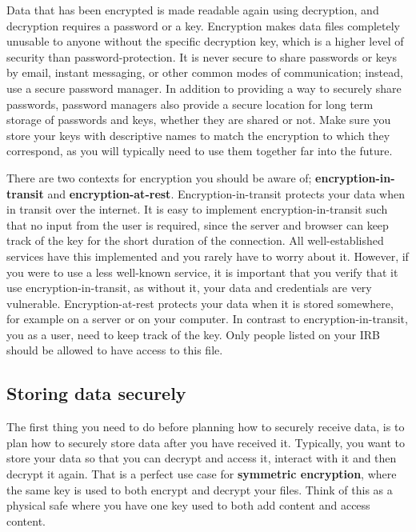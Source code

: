 Data that has been encrypted is made readable again using decryption,
and decryption requires a password or a key.
Encryption makes data files completely unusable
to anyone without the specific decryption key,
which is a higher level of security than password-protection.
It is never secure to share passwords or keys by email,
instant messaging, or other common modes of communication;
instead, use a secure password manager.
In addition to providing a way to securely share passwords,
password managers also provide a secure location
for long term storage of passwords and keys,
whether they are shared or not.
Make sure you store your keys with descriptive names
to match the encryption to which they correspond,
as you will typically need to use them together far into the future.

There are two contexts for encryption you should be aware of;
\textbf{encryption-in-transit}
and \textbf{encryption-at-rest}.
Encryption-in-transit protects your data when in transit over the internet.
It is easy to implement encryption-in-transit such that no input from the user is required,
since the server and browser can keep track of the key for the short duration of the connection.
All well-established services have this implemented and you rarely have to worry about it.
However, if you were to use a less well-known service,
it is important that you verify that it use encryption-in-transit,
as without it, your data and credentials are very vulnerable.
Encryption-at-rest protects your data when it is stored somewhere,
for example on a server or on your computer.
In contrast to encryption-in-transit,
you as a user, need to keep track of the key.
Only people listed on your IRB should be allowed to have access to this file.

\subsection{Storing data securely}
The first thing you need to do before planning how to securely receive data,
is to plan how to securely store data after you have received it.
Typically, you want to store your data so that you can decrypt and access it,
interact with it and then decrypt it again.
That is a perfect use case for \textbf{symmetric encryption},
where the same key is used to both encrypt and decrypt your files.
Think of this as a physical safe where you have one key
used to both add content and access content.

